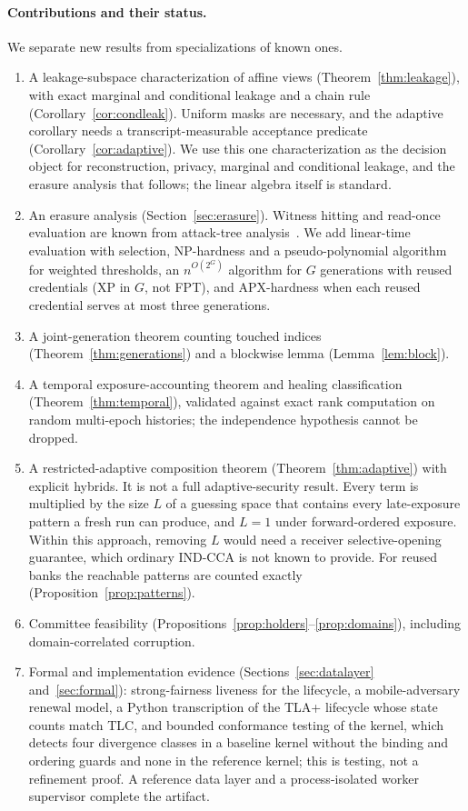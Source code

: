 \documentclass[pdflatex,sn-mathphys-num]{sn-jnl}%
\theoremstyle{plain}
\theoremstyle{definition}
\begin{document}
\paragraph{Contributions and their status.}
We separate new results from specializations of known ones.
\begin{enumerate}
\item A leakage-subspace characterization of affine views (Theorem~\ref{thm:leakage}), with exact marginal and conditional leakage and a chain rule (Corollary~\ref{cor:condleak}). Uniform masks are necessary, and the adaptive corollary needs a transcript-measurable acceptance predicate (Corollary~\ref{cor:adaptive}). We use this one characterization as the decision object for reconstruction, privacy, marginal and conditional leakage, and the erasure analysis that follows; the linear algebra itself is standard.
\item An erasure analysis (Section~\ref{sec:erasure}). Witness hitting and read-once evaluation are known from attack-tree analysis~\cite{mauw2005,lopuhaa2022}. We add linear-time evaluation with selection, NP-hardness and a pseudo-polynomial algorithm for weighted thresholds, an $n^{O(2^G)}$ algorithm for $G$ generations with reused credentials (XP in $G$, not FPT), and APX-hardness when each reused credential serves at most three generations.
\item A joint-generation theorem counting touched indices (Theorem~\ref{thm:generations}) and a blockwise lemma (Lemma~\ref{lem:block}).
\item A temporal exposure-accounting theorem and healing classification (Theorem~\ref{thm:temporal}), validated against exact rank computation on random multi-epoch histories; the independence hypothesis cannot be dropped.
\item A restricted-adaptive composition theorem (Theorem~\ref{thm:adaptive}) with explicit hybrids. It is not a full adaptive-security result. Every term is multiplied by the size $L$ of a guessing space that contains every late-exposure pattern a fresh run can produce, and $L=1$ under forward-ordered exposure. Within this approach, removing $L$ would need a receiver selective-opening guarantee, which ordinary IND-CCA is not known to provide. For reused banks the reachable patterns are counted exactly (Proposition~\ref{prop:patterns}).
\item Committee feasibility (Propositions~\ref{prop:holders}--\ref{prop:domains}), including domain-correlated corruption.
\item Formal and implementation evidence (Sections~\ref{sec:datalayer} and~\ref{sec:formal}): strong-fairness liveness for the lifecycle, a mobile-adversary renewal model, a Python transcription of the TLA+ lifecycle whose state counts match TLC, and bounded conformance testing of the kernel, which detects four divergence classes in a baseline kernel without the binding and ordering guards and none in the reference kernel; this is testing, not a refinement proof. A reference data layer and a process-isolated worker supervisor complete the artifact.
\end{enumerate}
\end{document}

